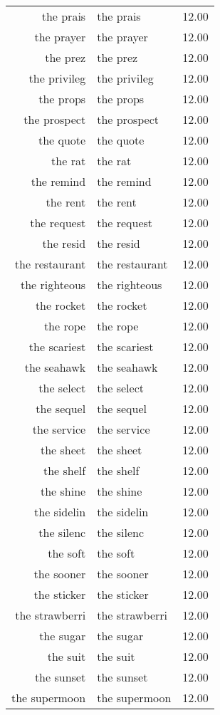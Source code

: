 \begin{table}[ht]
\begin{tabular}{rlr}
  the prais & the prais & 12.00 \\ 
  the prayer & the prayer & 12.00 \\ 
  the prez & the prez & 12.00 \\ 
  the privileg & the privileg & 12.00 \\ 
  the props & the props & 12.00 \\ 
  the prospect & the prospect & 12.00 \\ 
  the quote & the quote & 12.00 \\ 
  the rat & the rat & 12.00 \\ 
  the remind & the remind & 12.00 \\ 
  the rent & the rent & 12.00 \\ 
  the request & the request & 12.00 \\ 
  the resid & the resid & 12.00 \\ 
  the restaurant & the restaurant & 12.00 \\ 
  the righteous & the righteous & 12.00 \\ 
  the rocket & the rocket & 12.00 \\ 
  the rope & the rope & 12.00 \\ 
  the scariest & the scariest & 12.00 \\ 
  the seahawk & the seahawk & 12.00 \\ 
  the select & the select & 12.00 \\ 
  the sequel & the sequel & 12.00 \\ 
  the service & the service & 12.00 \\ 
  the sheet & the sheet & 12.00 \\ 
  the shelf & the shelf & 12.00 \\ 
  the shine & the shine & 12.00 \\ 
  the sidelin & the sidelin & 12.00 \\ 
  the silenc & the silenc & 12.00 \\ 
  the soft & the soft & 12.00 \\ 
  the sooner & the sooner & 12.00 \\ 
  the sticker & the sticker & 12.00 \\ 
  the strawberri & the strawberri & 12.00 \\ 
  the sugar & the sugar & 12.00 \\ 
  the suit & the suit & 12.00 \\ 
  the sunset & the sunset & 12.00 \\ 
  the supermoon & the supermoon & 12.00 \\ 

\end{tabular}
\end{table}
